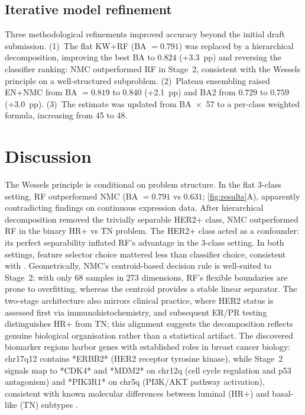 \documentclass[11pt,a4paper,twocolumn]{article}
\begin{document}
\subsection{Iterative model refinement}
\label{sec:improvements}

Three methodological refinements improved accuracy beyond the initial draft submission. (1)~The flat KW+RF (BA $= 0.791$) was replaced by a hierarchical decomposition, improving the best BA to $0.824$ (+3.3~pp) and reversing the classifier ranking: NMC outperformed RF in Stage~2, consistent with the Wessels principle on a well-structured subproblem. (2)~Plateau ensembling raised EN+NMC from BA $= 0.819$ to $0.840$ (+2.1~pp) and BA2 from $0.729$ to $0.759$ (+3.0~pp). (3)~The estimate was updated from BA~$\times$~57 to a per-class weighted formula, increasing from 45 to 48.

\section{Discussion}
\label{sec:discussion}

The Wessels principle is conditional on problem structure. In the flat 3-class setting, RF outperformed NMC (BA $= 0.791$ vs $0.631$; \autoref{fig:results}A), apparently contradicting findings on continuous expression data. After hierarchical decomposition removed the trivially separable HER2+ class, NMC outperformed RF in the binary HR+ vs TN problem. The HER2+ class acted as a confounder: its perfect separability inflated RF's advantage in the 3-class setting. In both settings, feature selector choice mattered less than classifier choice, consistent with \citet{wessels2005protocol}. Geometrically, NMC's centroid-based decision rule is well-suited to Stage~2: with only 68 samples in 273 dimensions, RF's flexible boundaries are prone to overfitting, whereas the centroid provides a stable linear separator. The two-stage architecture also mirrors clinical practice, where HER2 status is assessed first via immunohistochemistry, and subsequent ER/PR testing distinguishes HR+ from TN; this alignment suggests the decomposition reflects genuine biological organisation rather than a statistical artifact. The discovered biomarker regions harbor genes with established roles in breast cancer biology: chr17q12 contains *ERBB2* (HER2 receptor tyrosine kinase), while Stage~2 signals map to *CDK4* and *MDM2* on chr12q (cell cycle regulation and p53 antagonism) and *PIK3R1* on chr5q (PI3K/AKT pathway activation), consistent with known molecular differences between luminal (HR+) and basal-like (TN) subtypes \citep{chin2006genomic, sorlie2001gene}.
\end{document}
